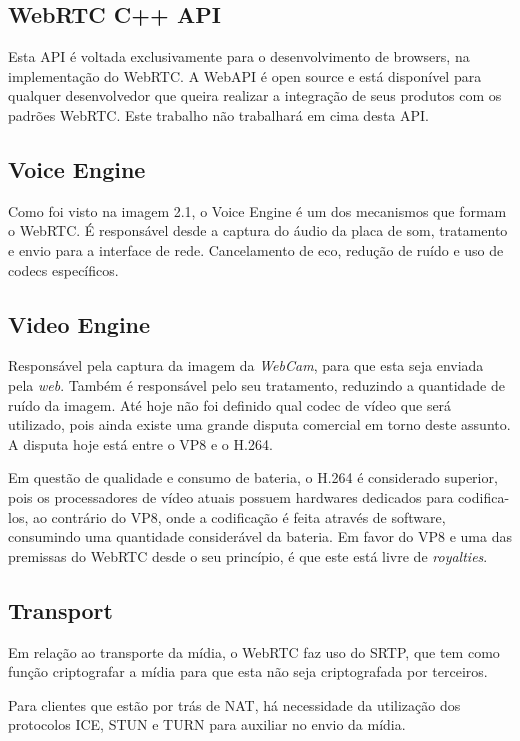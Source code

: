 \documentclass[12pt,a4paper,oneside]{report}
\begin{document}
\subsection{WebRTC C++ API}
\label{ss_webrtcAPI}
Esta API é voltada exclusivamente para o desenvolvimento de browsers, na implementação do WebRTC. A WebAPI é open source e está disponível para qualquer desenvolvedor que queira realizar a integração de seus produtos com os padrões WebRTC. Este trabalho não trabalhará em cima desta API.

\subsection{Voice Engine}
\label{ss_voiceEngine}
Como foi visto na imagem 2.1, o Voice Engine é um dos mecanismos que formam o WebRTC. É responsável desde a captura do áudio da placa de som, tratamento e envio para a interface de rede. Cancelamento de eco, redução de ruído e uso de codecs específicos.

\subsection{Video Engine}
\label{ss_videoEngine}
Responsável pela captura da imagem da \textit{WebCam}, para que esta seja enviada pela \textit{web}. Também é responsável pelo seu tratamento, reduzindo a quantidade de ruído da imagem.
Até hoje não foi definido qual codec de vídeo que será utilizado, pois ainda existe uma grande disputa comercial em torno deste assunto. A disputa hoje está entre o VP8 e o H.264. 

Em questão de qualidade e consumo de bateria, o H.264 é considerado superior, pois os processadores de vídeo atuais possuem hardwares dedicados para codifica-los, ao contrário do VP8, onde a codificação é feita através de software, consumindo uma quantidade considerável da bateria. Em favor do VP8 e uma das premissas do WebRTC desde o seu princípio, é que este está livre de \textit{royalties}\cite{Borges:2013}.

\subsection{Transport}
\label{ss_videoEngine}
Em relação ao transporte da mídia, o WebRTC faz uso do SRTP, que tem como função criptografar a mídia para que esta não seja criptografada por terceiros.

Para clientes que estão por trás de NAT, há necessidade da utilização dos protocolos ICE, STUN e TURN para auxiliar no envio da mídia. 
\end{document}
